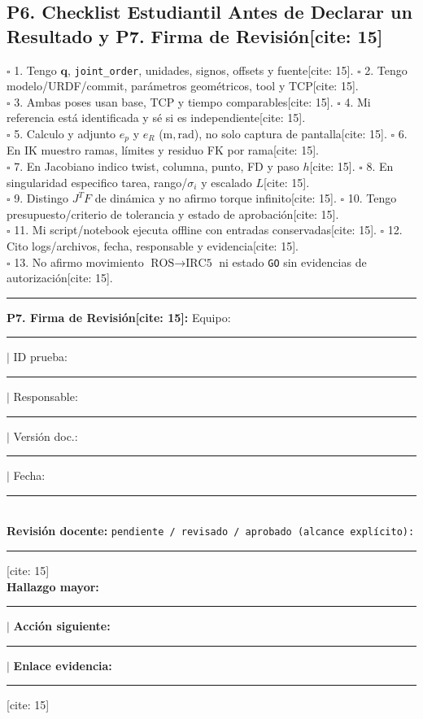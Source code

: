 \documentclass[10pt, a4paper]{article}
\begin{document}
\subsection*{P6. Checklist Estudiantil Antes de Declarar un Resultado y P7. Firma de Revisión[cite: 15]}
\begin{tcolorbox}[colback=white, colframe=ucbblue, left=2mm, right=2mm, top=1mm, bottom=1mm]
    \scriptsize\raggedright
    $\square$ 1. Tengo $\mathbf{q}$, \texttt{joint\_order}, unidades, signos, offsets y fuente[cite: 15]. \quad
    $\square$ 2. Tengo modelo/URDF/commit, parámetros geométricos, tool y TCP[cite: 15].\\
    $\square$ 3. Ambas poses usan base, TCP y tiempo comparables[cite: 15]. \quad
    $\square$ 4. Mi referencia está identificada y sé si es independiente[cite: 15].\\
    $\square$ 5. Calculo y adjunto $e_p$ y $e_R$ ($\mathrm{m}, \mathrm{rad}$), no solo captura de pantalla[cite: 15]. \quad
    $\square$ 6. En IK muestro ramas, límites y residuo FK por rama[cite: 15].\\
    $\square$ 7. En Jacobiano indico twist, columna, punto, FD y paso $h$[cite: 15]. \quad
    $\square$ 8. En singularidad especifico tarea, rango/$\sigma_i$ y escalado $L$[cite: 15].\\
    $\square$ 9. Distingo $J^T F$ de dinámica y no afirmo torque infinito[cite: 15]. \quad
    $\square$ 10. Tengo presupuesto/criterio de tolerancia y estado de aprobación[cite: 15].\\
    $\square$ 11. Mi script/notebook ejecuta offline con entradas conservadas[cite: 15]. \quad
    $\square$ 12. Cito logs/archivos, fecha, responsable y evidencia[cite: 15].\\
    $\square$ 13. No afirmo movimiento $\text{ROS}\to\text{IRC5}$ ni estado \texttt{GO} sin evidencias de autorización[cite: 15].
    \par\vspace{0.15cm}\hrule\vspace{0.15cm}
    \textbf{P7. Firma de Revisión[cite: 15]:} Equipo: \rule{2cm}{0.15mm} $\mid$ ID prueba: \rule{2cm}{0.15mm} $\mid$ Responsable: \rule{3cm}{0.15mm} $\mid$ Versión doc.: \rule{1.8cm}{0.15mm} $\mid$ Fecha: \rule{2cm}{0.15mm}\\
    \textbf{Revisión docente:} \texttt{pendiente / revisado / aprobado (alcance explícito):} \rule{5.5cm}{0.15mm}[cite: 15]\\
    \textbf{Hallazgo mayor:} \rule{4.2cm}{0.15mm} $\mid$ \textbf{Acción siguiente:} \rule{4.2cm}{0.15mm} $\mid$ \textbf{Enlace evidencia:} \rule{3.5cm}{0.15mm}[cite: 15]
\end{tcolorbox}
\end{document}
